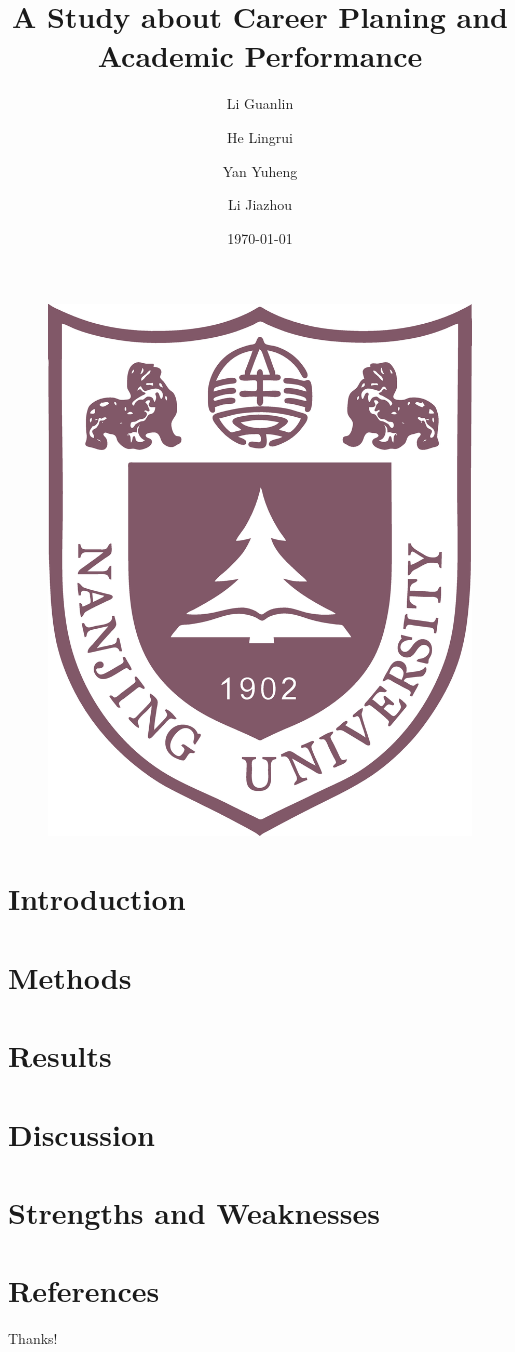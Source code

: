 \documentclass[hyperref]{beamer}
\title[Listening and Speaking Class]
{A Study about Career Planing and Academic Performance}
\author[Eric] %
{Li Guanlin\inst{1} \and He Lingrui\inst{1} \and Yan Yuheng\inst{1} \and Li Jiazhou\inst{1}}
\institute[NJU] %
{
\inst{1}%
Undergraduates of ICS\\
Nanjing University
\and
}
\date[NJU 2023] %
{\today}
\begin{document}
\begin{frame}
    \titlepage
    \begin{figure}[htpb]
        \begin{center}
            \includegraphics[width=0.2\linewidth]{pic/NJU_Logo.eps}
        \end{center}
    \end{figure}
\end{frame}

\begin{frame}
    \tableofcontents[sectionstyle=show,subsectionstyle=show/shaded/hide,subsubsectionstyle=show/shaded/hide]
\end{frame}

\section{Introduction}


\section{Methods}


\section{Results}


\section{Discussion}


\section{Strengths and Weaknesses}


\section{References}

\begin{frame}[allowframebreaks]
    
    
\end{frame}

\begin{frame}
    \begin{center}
        {\Huge\calligra Thanks!}\cite{origin}
    \end{center}
\end{frame}
\end{document}
